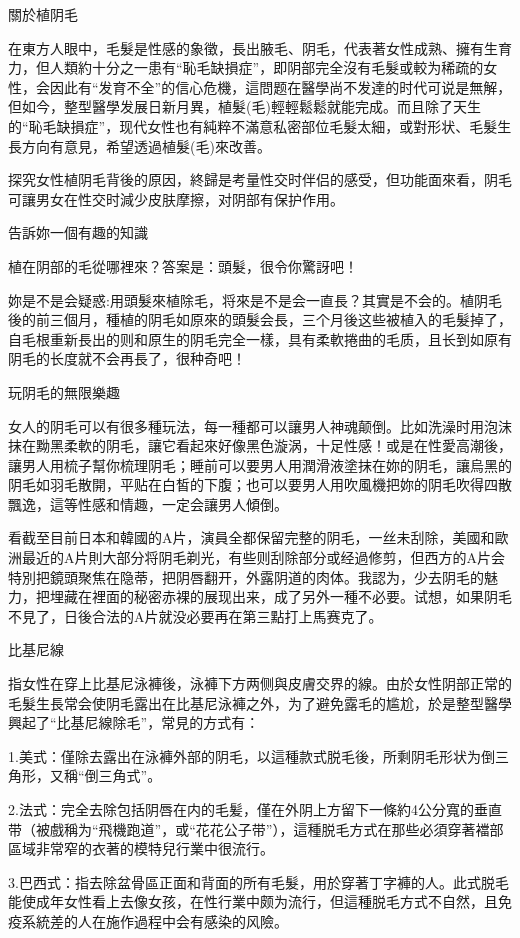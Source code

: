 \documentclass[12pt,UTF8]{ctexbook}
\begin{document}
關於植阴毛

在東方人眼中，毛髮是性感的象徵，長出腋毛、阴毛，代表著女性成熟、擁有生育力，但人類約十分之一患有“恥毛缺損症”，即阴部完全沒有毛髮或較为稀疏的女性，会因此有“发育不全”的信心危機，這問题在醫學尚不发達的时代可说是無解，但如今，整型醫學发展日新月異，植髮(毛)輕輕鬆鬆就能完成。而且除了天生的“恥毛缺損症”，现代女性也有純粹不滿意私密部位毛髮太細，或對形状、毛髮生長方向有意見，希望透過植髮(毛)來改善。

探究女性植阴毛背後的原因，終歸是考量性交时伴侣的感受，但功能面來看，阴毛可讓男女在性交时減少皮肤摩擦，对阴部有保护作用。

告訴妳一個有趣的知識

植在阴部的毛從哪裡來？答案是：頭髮，很令你驚訝吧！

妳是不是会疑惑:用頭髮來植除毛，将來是不是会一直長？其實是不会的。植阴毛後的前三個月，種植的阴毛如原來的頭髮会長，三个月後这些被植入的毛髮掉了，自毛根重新長出的则和原生的阴毛完全一樣，具有柔軟捲曲的毛质，且长到如原有阴毛的长度就不会再長了，很种奇吧！

玩阴毛的無限樂趣

女人的阴毛可以有很多種玩法，每一種都可以讓男人神魂颠倒。比如洗澡时用泡沫抹在黝黑柔軟的阴毛，讓它看起來好像黑色漩涡，十足性感！或是在性愛高潮後，讓男人用梳子幫你梳理阴毛；睡前可以要男人用潤滑液塗抹在妳的阴毛，讓烏黑的阴毛如羽毛散開，平贴在白皙的下腹；也可以要男人用吹風機把妳的阴毛吹得四散飄逸，這等性感和情趣，一定会讓男人傾倒。

看截至目前日本和韓國的A片，演員全都保留完整的阴毛，一丝未刮除，美國和歐洲最近的A片則大部分将阴毛剃光，有些则刮除部分或经過修剪，但西方的A片会特別把鏡頭聚焦在隐蒂，把阴唇翻开，外露阴道的肉体。我認为，少去阴毛的魅力，把埋藏在裡面的秘密赤裸的展现出来，成了另外一種不必要。试想，如果阴毛不見了，日後合法的A片就没必要再在第三點打上馬赛克了。

比基尼線

指女性在穿上比基尼泳褲後，泳褲下方两侧與皮膚交界的線。由於女性阴部正常的毛髮生長常会使阴毛露出在比基尼泳褲之外，为了避免露毛的尴尬，於是整型醫學興起了“比基尼線除毛”，常見的方式有：

1.美式：僅除去露出在泳褲外部的阴毛，以這種款式脱毛後，所剩阴毛形状为倒三角形，又稱“倒三角式”。

2.法式：完全去除包括阴唇在内的毛髪，僅在外阴上方留下一條約4公分寬的垂直带（被戲稱为“飛機跑道”，或“花花公子带”），這種脱毛方式在那些必須穿著襠部區域非常窄的衣著的模特兒行業中很流行。

3.巴西式：指去除盆骨區正面和背面的所有毛髮，用於穿著丁字褲的人。此式脱毛能使成年女性看上去像女孩，在性行業中颇为流行，但這種脱毛方式不自然，且免疫系統差的人在施作過程中会有感染的风險。
\end{document}
